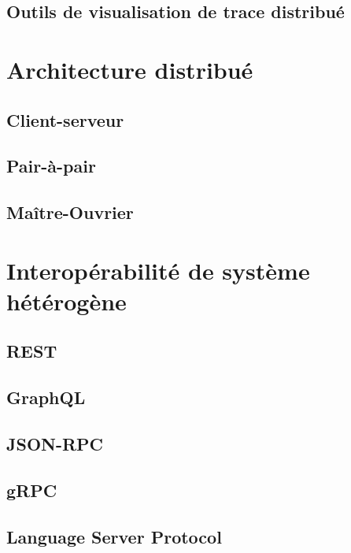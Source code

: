\subsection{Outils de visualisation de trace distribué}


\section{Architecture distribué}

\subsection{Client-serveur}

\subsection{Pair-à-pair} 

\subsection{Maître-Ouvrier}


\section{Interopérabilité de système hétérogène}

\subsection{REST}

\subsection{GraphQL}

\subsection{JSON-RPC}

\subsection{gRPC}

\subsection{Language Server Protocol}

